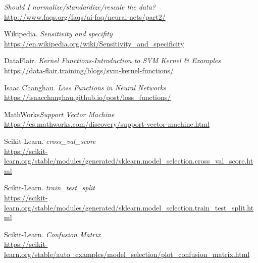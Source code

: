 \documentclass[11pt,a4paper]{article}
\begin{document}
\begin{thebibliography}{}
    \textit{Should I normalize/standardize/rescale the data?}
    \\\url{http://www.faqs.org/faqs/ai-faq/neural-nets/part2/}
    
    Wikipedia. \textit{Sensitivity and specifity}
    \\\url{https://en.wikipedia.org/wiki/Sensitivity_and_specificity}
    
    DataFlair. \textit{Kernel Functions-Introduction to SVM Kernel \& Examples}
    \\\url{https://data-flair.training/blogs/svm-kernel-functions/}
    
    Isaac Changhau. \textit{Loss Functions in Neural Networks}
    \\\url{https://isaacchanghau.github.io/post/loss_functions/}
    
    MathWorks\textit{Support Vector Machine}
    \\\url{https://es.mathworks.com/discovery/support-vector-machine.html}
    
    Scikit-Learn. \textit{cross\_val\_score}
    \\\url{https://scikit-learn.org/stable/modules/generated/sklearn.model_selection.cross_val_score.html}
    
    Scikit-Learn. \textit{train\_test\_split}
    \\\url{https://scikit-learn.org/stable/modules/generated/sklearn.model_selection.train_test_split.html}
    
    Scikit-Learn. \textit{Confusion Matrix}
    \\\url{https://scikit-learn.org/stable/auto_examples/model_selection/plot_confusion_matrix.html}
    
    \end{thebibliography}
\end{document}
